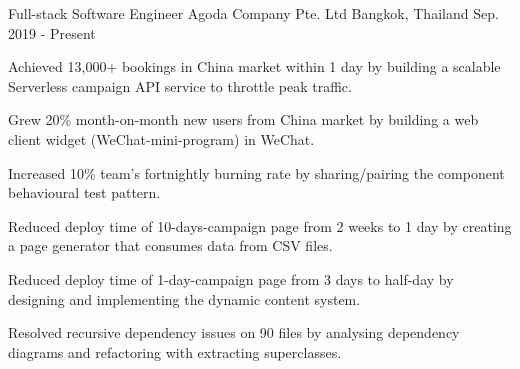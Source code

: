 

\begin{cventries}

  \cventry
  {Full-stack Software Engineer} %
  {Agoda Company Pte. Ltd} %
  {Bangkok, Thailand} %
  {Sep. 2019 - Present} %
  {
    \begin{cvitems} %
      \item {Achieved 13,000+ bookings in China market within 1 day by building a scalable Serverless campaign API service to throttle peak traffic.}
      \item {Grew 20\% month-on-month new users from China market by building a web client widget (WeChat-mini-program) in WeChat.}
      \item {Increased 10\% team's fortnightly burning rate by sharing/pairing the component behavioural test pattern.}
      \item {Reduced deploy time of 10-days-campaign page from 2 weeks to 1 day by creating a page generator that consumes data from CSV files.}
      \item {Reduced deploy time of 1-day-campaign page from 3 days to half-day by designing and implementing the dynamic content system.}
      \item {Resolved recursive dependency issues on 90 files by analysing dependency diagrams and refactoring with extracting superclasses.}
    \end{cvitems}
  }


\end{cventries}
